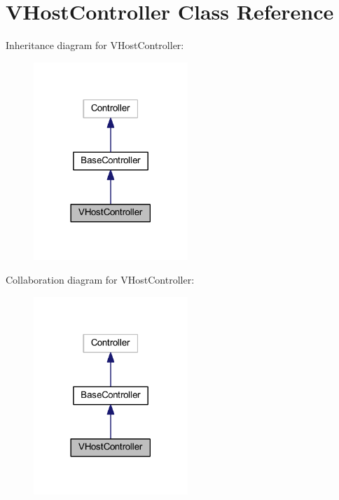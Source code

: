 \hypertarget{class_v_host_controller}{}\section{V\+Host\+Controller Class Reference}
\label{class_v_host_controller}


Inheritance diagram for V\+Host\+Controller\+:
\nopagebreak
\begin{figure}[H]
\begin{center}
\leavevmode
\includegraphics[width=165pt]{class_v_host_controller__inherit__graph}
\end{center}
\end{figure}


Collaboration diagram for V\+Host\+Controller\+:
\nopagebreak
\begin{figure}[H]
\begin{center}
\leavevmode
\includegraphics[width=165pt]{class_v_host_controller__coll__graph}
\end{center}
\end{figure}

